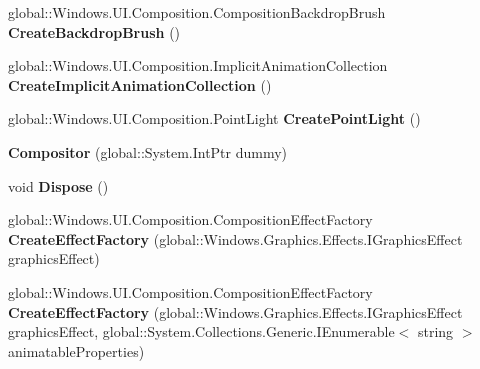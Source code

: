 \begin{DoxyCompactItemize}
\item 
\mbox{\label{class_windows_1_1_u_i_1_1_composition_1_1_compositor_a718536eab5dc7541088008ef9798ad19}} 
global\+::\+Windows.\+U\+I.\+Composition.\+Composition\+Backdrop\+Brush {\bfseries Create\+Backdrop\+Brush} ()
\item 
\mbox{\label{class_windows_1_1_u_i_1_1_composition_1_1_compositor_a24135a36c54df364a599ced5e16e5440}} 
global\+::\+Windows.\+U\+I.\+Composition.\+Implicit\+Animation\+Collection {\bfseries Create\+Implicit\+Animation\+Collection} ()
\item 
\mbox{\label{class_windows_1_1_u_i_1_1_composition_1_1_compositor_abbf5f6803a17b21b39e1cf6a0b23fc6e}} 
global\+::\+Windows.\+U\+I.\+Composition.\+Point\+Light {\bfseries Create\+Point\+Light} ()
\item 
\mbox{\label{class_windows_1_1_u_i_1_1_composition_1_1_compositor_ae8673b74eda4f57113626510ac491007}} 
{\bfseries Compositor} (global\+::\+System.\+Int\+Ptr dummy)
\item 
\mbox{\label{class_windows_1_1_u_i_1_1_composition_1_1_compositor_ac90a7018efb0edbc42378c43cb94e3fa}} 
void {\bfseries Dispose} ()
\item 
\mbox{\label{class_windows_1_1_u_i_1_1_composition_1_1_compositor_a0f263c7b996908ce12d789c3d640ee71}} 
global\+::\+Windows.\+U\+I.\+Composition.\+Composition\+Effect\+Factory {\bfseries Create\+Effect\+Factory} (global\+::\+Windows.\+Graphics.\+Effects.\+I\+Graphics\+Effect graphics\+Effect)
\item 
\mbox{\label{class_windows_1_1_u_i_1_1_composition_1_1_compositor_ac3bb6a6e92997bf4740fbf43e243ea7a}} 
global\+::\+Windows.\+U\+I.\+Composition.\+Composition\+Effect\+Factory {\bfseries Create\+Effect\+Factory} (global\+::\+Windows.\+Graphics.\+Effects.\+I\+Graphics\+Effect graphics\+Effect, global\+::\+System.\+Collections.\+Generic.\+I\+Enumerable$<$ string $>$ animatable\+Properties)

\end{DoxyCompactItemize}
